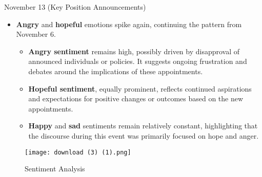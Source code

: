 \documentclass[sigconf]{acmart}
\begin{document}
{November 13 (Key Position Announcements)}
\begin{itemize}
    \item \textbf{Angry} and \textbf{hopeful} emotions spike again, continuing the pattern from November 6.
    \begin{itemize}
        \item \textbf{Angry sentiment} remains high, possibly driven by disapproval of announced individuals or policies. It suggests ongoing frustration and debates around the implications of these appointments.
        \item \textbf{Hopeful sentiment}, equally prominent, reflects continued aspirations and expectations for positive changes or outcomes based on the new appointments.
        \item \textbf{Happy} and \textbf{sad} sentiments remain relatively constant, highlighting that the discourse during this event was primarily focused on hope and anger.
    \end{itemize}
\end{itemize}

\begin{figure}
    \centering
    \texttt{[image: download (3) (1).png]}
    \caption{Sentiment Analysis}
    \label{fig:enter-label}
\end{figure}
\end{document}
